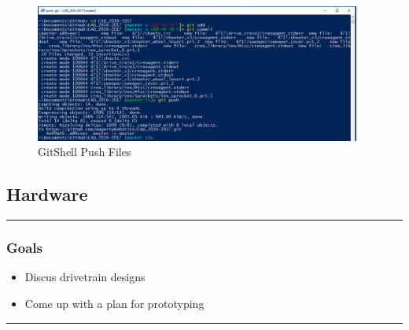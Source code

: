 \begin{figure}
\centering
\includegraphics[width=0.955\textwidth, angle=0]{Meetings/September/09-23-21/gitshellpush.png}
\caption{GitShell Push Files}
\label{fig:pic4}
\end{figure}


\subsection*{Hardware}
\noindent\hfil\rule{\textwidth}{.4pt}\hfil
\subsubsection*{Goals}
\begin{itemize}
    \item Discus drivetrain designs
    \item Come up with a plan for prototyping
\end{itemize} 

\noindent\hfil\rule{\textwidth}{.4pt}\hfil

